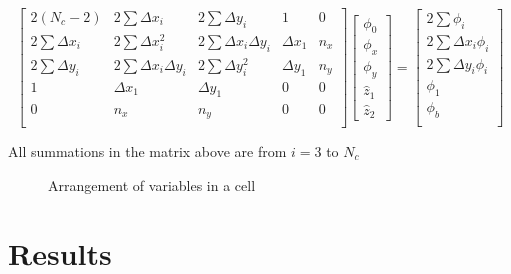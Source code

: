 \documentclass[final,3p,review]{elsarticle}
\begin{document}
	\begin{equation}
		\begin{bmatrix}
			2(N_c-2) & 2\sum \Delta x_i & 2\sum \Delta y_i & 1 & 0\\
			2\sum \Delta x_i & 2\sum \Delta x_i^2 & 2\sum \Delta x_i \Delta y_i & \Delta x_1 & n_x \\
			2\sum \Delta y_i & 2\sum \Delta x_i \Delta y_i & 2\sum \Delta y_i^2 & \Delta y_1 & n_y \\
			1 & \Delta x_1 & \Delta y_1 & 0 & 0 \\
			0 & n_x & n_y & 0 & 0 \\
		\end{bmatrix}
		\begin{bmatrix}
			\phi_0 \\
			\phi_x \\
			\phi_y \\
			\hat{z}_1 \\ 
			\hat{z}_2
		\end{bmatrix}	
		= 
		\begin{bmatrix}
			2\sum \phi_i \\
			2\sum \Delta x_i \phi_i  \\ 
			2\sum \Delta y_i \phi_i \\
			\phi_1 \\
			\phi_b \\ 
		\end{bmatrix}	
	\end{equation} 
	
	All summations in the matrix above are from $i = 3$ to $N_c$
	
	\begin{figure}
		\centering
		
		
		\caption{Arrangement of variables in a cell}
		
	\end{figure}
	
	\section{Results}
	
\end{document}
